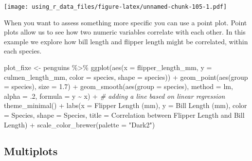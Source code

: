 \documentclass[
]{book}
\newenvironment{Shaded}{\begin{snugshade}}{\end{snugshade}}
\newcommand{\AttributeTok}[1]{\textcolor[rgb]{0.77,0.63,0.00}{#1}}
\newcommand{\CommentTok}[1]{\textcolor[rgb]{0.56,0.35,0.01}{\textit{#1}}}
\newcommand{\DecValTok}[1]{\textcolor[rgb]{0.00,0.00,0.81}{#1}}
\newcommand{\FloatTok}[1]{\textcolor[rgb]{0.00,0.00,0.81}{#1}}
\newcommand{\FunctionTok}[1]{\textcolor[rgb]{0.00,0.00,0.00}{#1}}
\newcommand{\NormalTok}[1]{#1}
\newcommand{\OtherTok}[1]{\textcolor[rgb]{0.56,0.35,0.01}{#1}}
\newcommand{\SpecialCharTok}[1]{\textcolor[rgb]{0.00,0.00,0.00}{#1}}
\newcommand{\StringTok}[1]{\textcolor[rgb]{0.31,0.60,0.02}{#1}}
\begin{document}
\texttt{[image: using\_r\_data\_files/figure-latex/unnamed-chunk-105-1.pdf]}

When you want to assess something more specific you can use a point plot.
Point plots allow us to see how two numeric variables correlate with each other.
In this example we explore how bill length and flipper length might be correlated, within each species.

\begin{Shaded}
\begin{Highlighting}[]
\NormalTok{plot\_fixe }\OtherTok{\textless{}{-}}\NormalTok{ penguins }\SpecialCharTok{\%\textgreater{}\%} 
  \FunctionTok{ggplot}\NormalTok{(}\FunctionTok{aes}\NormalTok{(}\AttributeTok{x =}\NormalTok{ flipper\_length\_mm, }\AttributeTok{y =}\NormalTok{ culmen\_length\_mm, }\AttributeTok{color =}\NormalTok{ species, }\AttributeTok{shape =}\NormalTok{ species)) }\SpecialCharTok{+} 
  \FunctionTok{geom\_point}\NormalTok{(}\FunctionTok{aes}\NormalTok{(}\AttributeTok{group =}\NormalTok{ species), }\AttributeTok{size =} \FloatTok{1.7}\NormalTok{) }\SpecialCharTok{+}
  \FunctionTok{geom\_smooth}\NormalTok{(}\FunctionTok{aes}\NormalTok{(}\AttributeTok{group =}\NormalTok{ species), }\AttributeTok{method =} \StringTok{\textquotesingle{}lm\textquotesingle{}}\NormalTok{, }\AttributeTok{alpha =}\NormalTok{ .}\DecValTok{2}\NormalTok{, }\AttributeTok{formula =} \StringTok{\textquotesingle{}y \textasciitilde{} x\textquotesingle{}}\NormalTok{) }\SpecialCharTok{+} \CommentTok{\# adding a line based on linear regression}
  \FunctionTok{theme\_minimal}\NormalTok{() }\SpecialCharTok{+}
  \FunctionTok{labs}\NormalTok{(}\AttributeTok{x =} \StringTok{\textquotesingle{}Flipper Length (mm)\textquotesingle{}}\NormalTok{, }\AttributeTok{y =} \StringTok{\textquotesingle{}Bill Length (mm)\textquotesingle{}}\NormalTok{,}
       \AttributeTok{color =} \StringTok{\textquotesingle{}Species\textquotesingle{}}\NormalTok{, }\AttributeTok{shape =} \StringTok{\textquotesingle{}Species\textquotesingle{}}\NormalTok{,}
       \AttributeTok{title =} \StringTok{\textquotesingle{}Correlation between Flipper Length and Bill Length\textquotesingle{}}\NormalTok{) }\SpecialCharTok{+}
  \FunctionTok{scale\_color\_brewer}\NormalTok{(}\AttributeTok{palette =} \StringTok{"Dark2"}\NormalTok{)}
\end{Highlighting}
\end{Shaded}

\hypertarget{multiplots}{%
\subsection{Multiplots}\label{multiplots}}
\end{document}
